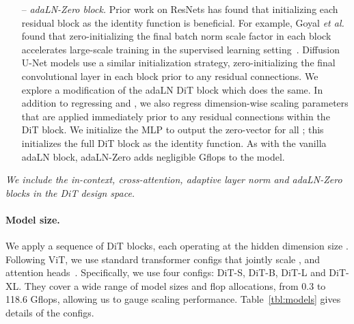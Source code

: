 \documentclass[10pt,twocolumn,letterpaper]{article}
\makeatletter
\def\etal{\emph{et al.}\@\xspace}
\makeatother
\begin{document}
\begin{itemize}
\item[--] \textit{adaLN-Zero block.} Prior work on ResNets has found that initializing each residual block as the identity function is beneficial. For example, Goyal \etal found that zero-initializing the final batch norm scale factor  in each block accelerates large-scale training in the supervised learning setting~\cite{Goyal2017b}. Diffusion U-Net models use a similar initialization strategy, zero-initializing the final convolutional layer in each block prior to any residual connections. We explore a modification of the adaLN DiT block which does the same. In addition to regressing  and , we also regress dimension-wise scaling parameters  that are applied immediately prior to any residual connections within the DiT block. We initialize the MLP to output the zero-vector for all ; this initializes the full DiT block as the identity function. As with the vanilla adaLN block, adaLN-Zero adds negligible Gflops to the model.

\end{itemize}

\emph{We include the in-context, cross-attention, adaptive layer norm and adaLN-Zero blocks in the DiT design space.} 

\begin{table}
\centering
\small
{}
\caption{\textbf{Details of DiT models.} We follow ViT~\cite{Dosovitskiy2020} model configurations for the Small (S), Base (B) and Large (L) variants; we also introduce an XLarge (XL) config as our largest model.}
\label{tbl:models}
\end{table}

\paragraph{Model size.}
We apply a sequence of  DiT blocks, each operating at the hidden dimension size . Following ViT, we use standard transformer configs that jointly scale ,  and attention heads~\cite{Dosovitskiy2020,zhai2022scaling}. Specifically, we use four configs: DiT-S, DiT-B, DiT-L and DiT-XL. They cover a wide range of model sizes and flop allocations, from 0.3 to 118.6 Gflops, allowing us to gauge scaling performance. Table~\ref{tbl:models} gives details of the configs. 
\end{document}
